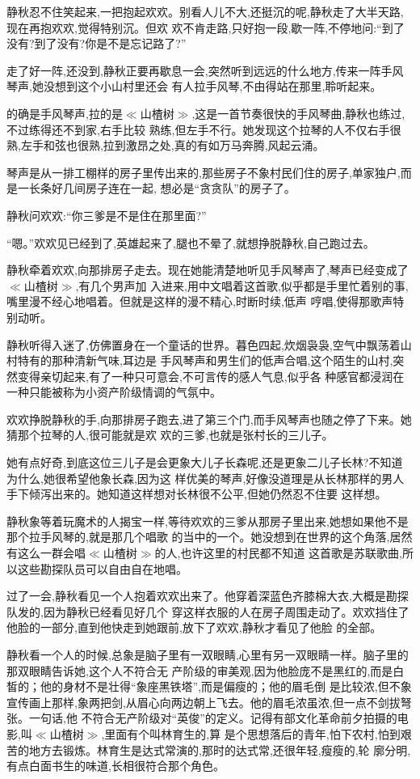 ﻿\documentclass[12pt]{article}
\begin{document}
静秋忍不住笑起来,一把抱起欢欢。别看人儿不大,还挺沉的呢,静秋走了大半天路,现在再抱欢欢,觉得特别沉。但欢
欢不肯走路,只好抱一段,歇一阵,不停地问:``到了没有?到了没有?你是不是忘记路了?''

走了好一阵,还没到,静秋正要再歇息一会,突然听到远远的什么地方,传来一阵手风琴声,她没想到这个小山村里还会
有人拉手风琴,不由得站在那里,聆听起来。

的确是手风琴声,拉的是$\ll$山楂树$\gg$,这是一首节奏很快的手风琴曲,静秋也练过,不过练得还不到家,右手比较
熟练,但左手不行。她发现这个拉琴的人不仅右手很熟,左手和弦也很熟,拉到激昂之处,真的有如万马奔腾,风起云涌。

琴声是从一排工棚样的房子里传出来的,那些房子不象村民们住的房子,单家独户,而是一长条好几间房子连在一起,
想必是``贪贪队''的房子了。

静秋问欢欢:``你三爹是不是住在那里面?''

``嗯。''欢欢见已经到了,英雄起来了,腿也不晕了,就想挣脱静秋,自己跑过去。

静秋牵着欢欢,向那排房子走去。现在她能清楚地听见手风琴声了,琴声已经变成了$\ll$山楂树$\gg$,有几个男声加
入进来,用中文唱着这首歌,似乎都是手里忙着别的事,嘴里漫不经心地唱着。但就是这样的漫不精心,时断时续,低声
哼唱,使得那歌声特别动听。

静秋听得入迷了,仿佛置身在一个童话的世界。暮色四起,炊烟袅袅,空气中飘荡着山村特有的那种清新气味,耳边是
手风琴声和男生们的低声合唱,这个陌生的山村,突然变得亲切起来,有了一种只可意会,不可言传的感人气息,似乎各
种感官都浸润在一种只能被称为小资产阶级情调的气氛中。

欢欢挣脱静秋的手,向那排房子跑去,进了第三个门,而手风琴声也随之停了下来。她猜那个拉琴的人,很可能就是欢
欢的三爹,也就是张村长的三儿子。

她有点好奇,到底这位三儿子是会更象大儿子长森呢,还是更象二儿子长林?不知道为什么,她很希望他象长森,因为这
样优美的琴声,好像没道理是从长林那样的男人手下倾泻出来的。她知道这样想对长林很不公平,但她仍然忍不住要
这样想。

静秋象等着玩魔术的人揭宝一样,等待欢欢的三爹从那房子里出来,她想如果他不是那个拉手风琴的,就是那几个唱歌
的当中的一个。她没想到在世界的这个角落,居然有这么一群会唱$\ll$山楂树$\gg$的人,也许这里的村民都不知道
这首歌是苏联歌曲,所以这些勘探队员可以自由自在地唱。

过了一会,静秋看见一个人抱着欢欢出来了。他穿着深蓝色齐膝棉大衣,大概是勘探队发的,因为静秋已经看见好几个
穿这样衣服的人在房子周围走动了。欢欢挡住了他脸的一部分,直到他快走到她跟前,放下了欢欢,静秋才看见了他脸
的全部。

静秋看一个人的时候,总象是脑子里有一双眼睛,心里有另一双眼睛一样。脑子里的那双眼睛告诉她,这个人不符合无
产阶级的审美观,因为他脸庞不是黑红的,而是白皙的；他的身材不是壮得``象座黑铁塔'',而是偏瘦的；他的眉毛倒
是比较浓,但不象宣传画上那样,象两把剑,从眉心向两边朝上飞去。他的眉毛浓虽浓,但一点不剑拔弩张。一句话,他
不符合无产阶级对``英俊''的定义。记得有部文化革命前夕拍摄的电影,叫$\ll$山楂树$\gg$,里面有个叫林育生的,算
是个思想落后的青年,怕下农村,怕到艰苦的地方去锻炼。林育生是达式常演的,那时的达式常,还很年轻,瘦瘦的,轮
廓分明,有点白面书生的味道,长相很符合那个角色。
\end{document}
